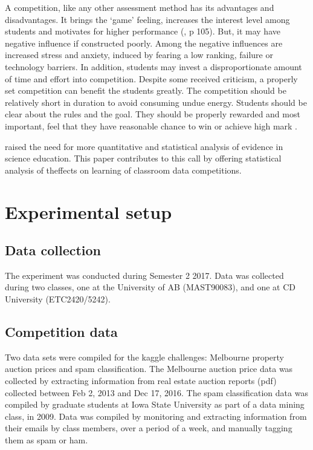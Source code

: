 \documentclass[12pt]{article}
\begin{document}
A competition, like any other assessment method has its advantages and
disadvantages. It brings the `game' feeling, increases the interest
level among students and motivates for higher performance
(\citet{Shindler09}, p 105). But, it may have negative influence if
constructed poorly. Among the negative influences are increased stress
and anxiety, induced by fearing a low ranking, failure or technology
barriers. In addition, students may invest a disproportionate amount of
time and effort into competition. Despite some received criticism, a
properly set competition can benefit the students greatly. The
competition should be relatively short in duration to avoid consuming
undue energy. Students should be clear about the rules and the goal.
They should be properly rewarded and most important, feel that they have
reasonable chance to win or achieve high mark \citep{Shindler09}.

\citet{Shelley08} raised the need for more quantitative and statistical
analysis of evidence in science education. This paper contributes to
this call by offering statistical analysis of theffects on learning of
classroom data competitions.

\section{Experimental setup}\label{experimental-setup}

\subsection{Data collection}\label{data-collection}

The experiment was conducted during Semester 2 2017. Data was collected
during two classes, one at the University of AB (MAST90083), and one at
CD University (ETC2420/5242).

\subsection{Competition data}\label{competition-data}

Two data sets were compiled for the kaggle challenges: Melbourne
property auction prices and spam classification. The Melbourne auction
price data was collected by extracting information from real estate
auction reports (pdf) collected between Feb 2, 2013 and Dec 17, 2016.
The spam classification data was compiled by graduate students at Iowa
State University as part of a data mining class, in 2009. Data was
compiled by monitoring and extracting information from their emails by
class members, over a period of a week, and manually tagging them as
spam or ham.
\end{document}
